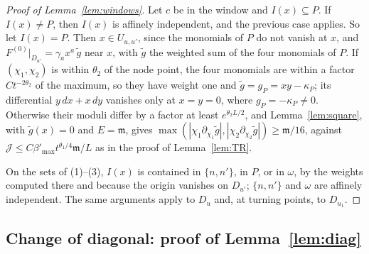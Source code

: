 \begin{proof}[Proof of Lemma~\ref{lem:windows}]
Let $c$ be in the window and $I(x)\subseteq P$. If $I(x)\neq P$, then $I(x)$ is affinely independent, and the previous
case applies. So let $I(x)=P$. Then $x\in U_{u,u'}$, since the monomials of $P$ do not vanish at $x$, and
$F^{(0)}|_{D_{u'}}=\gamma_ax^a\,\tilde g$ near $x$, with $\tilde g$ the weighted sum of the four monomials of $P$. If
$(\chi_1,\chi_2)$ is within $\theta_2$ of the node point, the four monomials are within a factor $Ct^{-2\theta_2}$ of the
maximum, so they have weight one and $\tilde g=g_P=xy-\kappa_P$; its differential $y\,dx+x\,dy$ vanishes only at $x=y=0$,
where $g_P=-\kappa_P\neq0$. Otherwise their moduli differ by a factor at least $e^{\theta_2L/2}$, and
Lemma~\ref{lem:square}, with $\tilde g(x)=0$ and $E=\mathfrak m$, gives
$\max(|\chi_1\partial_{\chi_1}\tilde g|,|\chi_2\partial_{\chi_2}\tilde g|)\ge\mathfrak m/16$, against
$\mathcal J\le C\beta'_{\max}t^{\theta_1/4}\mathfrak m/L$ as in the proof of Lemma~\ref{lem:TR}.

On the sets of (1)--(3), $I(x)$ is contained in $\{n,n'\}$, in $P$, or in $\omega$, by the weights computed there and
because the origin vanishes on $D_{u'}$; $\{n,n'\}$ and $\omega$ are affinely independent. The same arguments apply to $D_u$
and, at turning points, to $D_{u_1}$.
\end{proof}

\subsection{Change of diagonal: proof of Lemma~\ref{lem:diag}}

